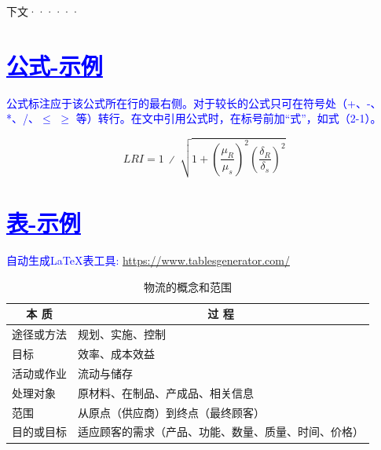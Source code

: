 下文······

\section{\textcolor{blue}{\underline{\underline{公式-示例}}}}

\textcolor{blue}{公式标注应于该公式所在行的最右侧。对于较长的公式只可在符号处（+、-、*、/、$\leqslant$ $\geqslant$ 等）转行。在文中引用公式时，在标号前加“式”，如式（2-1）。}


\begin{equation}
    LRI=1\ ∕\ \sqrt{ 1 + {\left(\frac{{\mu}_{R}}{{\mu}_{s}}\right)^{2}}{\left(\frac{{\delta}_{R}}{{\delta}_{s}}\right)^{2}} }
\end{equation}

\section{\textcolor{blue}{\underline{\underline{表-示例}}}}

\textcolor{blue}{{自动生成LaTeX表工具: \url{https://www.tablesgenerator.com/}}}

\begin{table}[htbp]
  \linespread{1.5}
  \songti
  \centering
  \caption{物流的概念和范围}\label{物流的概念和范围}
  \begin{tabular}{|l|l|}
  \hline
  \multicolumn{1}{|c|}{本 质} & \multicolumn{1}{c|}{过  程}  \\ \hline
  途径或方法                     & 规划、实施、控制                   \\ \hline
  目标                        & 效率、成本效益                    \\ \hline
  活动或作业                     & 流动与储存                      \\ \hline
  处理对象                      & 原材料、在制品、产成品、相关信息           \\ \hline
  范围                        & 从原点（供应商）到终点（最终顾客）          \\ \hline
  目的或目标                     & 适应顾客的需求（产品、功能、数量、质量、时间、价格） \\ \hline
  \end{tabular}
\end{table}

